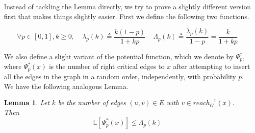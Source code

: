 \documentclass{article}
\newtheorem{lemma}{Lemma}
\begin{document}
Instead of tackling the Lemma directly, we try to prove a slightly different version first that makes things slightly easier. First we define the following two functions.

\[ 
\forall p \in [0,1], k \geq 0, \;\;\;\; \lambda_p(k) \triangleq \frac{k(1-p)}{1+kp}   \;\;\;\; \Lambda_p(k) \triangleq \frac{\lambda_p(k)}{1-p} = \frac{k}{1+kp}
\]

We also define a slight variant of the potential function, which we denote by $\Psi^*_p$, where $\Psi^*_p(x)$ is the number of right critical edges to $x$ after attempting to insert all the edges in the graph in a random order, independently, with probability $p$. We have the following analogous Lemma.

\begin{lemma}

Let $k$ be the number of edges $(u,v) \in E$ with $v \in reach^{-1}_G(x)$. Then
\[ \mathbb{E}[\Psi^*_p(x)] \leq \Lambda_p(k) \]
\end{lemma}
\end{document}
